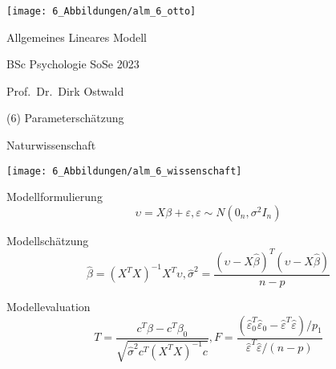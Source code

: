 \documentclass[
  8pt,
  ignorenonframetext,
]{beamer}
\author{}
\date{\vspace{-2.5em}}
\begin{document}
\begin{frame}[plain]{}
\protect\hypertarget{section}{}
\center

\begin{center}\texttt{[image: 6\_Abbildungen/alm\_6\_otto]} \end{center}

\vspace{2mm}

\huge

Allgemeines Lineares Modell \vspace{6mm}

\large

BSc Psychologie SoSe 2023

\vspace{6mm}
\normalsize

Prof.~Dr.~Dirk Ostwald
\end{frame}

\begin{frame}[plain]{}
\protect\hypertarget{section-1}{}
\center
\huge
\vfill

\noindent (6) Parameterschätzung \vfill
\end{frame}

\begin{frame}{}
\protect\hypertarget{section-2}{}
\large

Naturwissenschaft \vspace{7mm}

\begin{center}\texttt{[image: 6\_Abbildungen/alm\_6\_wissenschaft]} \end{center}
\end{frame}

\begin{frame}{}
\protect\hypertarget{section-3}{}
\vspace{1mm}
\normalsize

Modellformulierung \vspace{1mm} \small \begin{equation}
\upsilon = X\beta + \varepsilon, \varepsilon \sim N(0_n,\sigma^2I_n)
\end{equation} \vspace{5mm}

\normalsize

Modellschätzung \small \begin{equation}
\hat{\beta} = (X^TX)^{-1} X^T\upsilon,  \hat{\sigma}^2 = \frac{(\upsilon-X\hat{\beta})^T(\upsilon-X\hat{\beta})}{n-p}
\end{equation} \vspace{4mm}

\normalsize

Modellevaluation \small \begin{equation}
T = \frac{c^T\hat{\beta} - c^T\beta_0}{\sqrt{\hat{\sigma}^2c^T(X^TX)^{-1}c}},
F = \frac{(\hat{\varepsilon}_0^T\hat{\varepsilon}_0 - \hat{\varepsilon}^T\hat{\varepsilon})/p_1}{\hat{\varepsilon}^T\hat{\varepsilon}/(n-p)}
\end{equation}
\end{frame}
\end{document}
